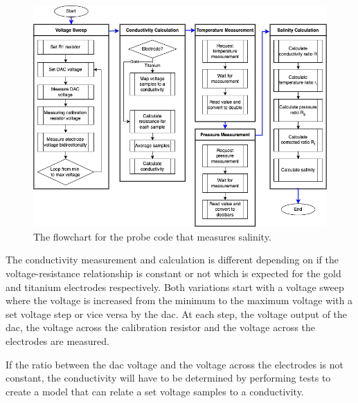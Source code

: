 \begin{figure}[ht]
    \centering
    \includegraphics[width=1\textwidth]{Figures/probe_flowchart}
    \caption{The flowchart for the probe code that measures salinity.}
    \label{fig:probe-code-flowchart} %
\end{figure}

The conductivity measurement and calculation is different depending on if the voltage-resistance relationship is constant or not which is expected for the gold and titanium electrodes respectively.
Both variations start with a voltage sweep where the voltage is increased from the minimum to the maximum voltage with a set voltage step or vice versa by the \gls{dac}.
At each step, the voltage output of the \gls{dac}, the voltage across the calibration resistor and the voltage across the electrodes are measured.

If the ratio between the \gls{dac} voltage and the voltage across the electrodes is not constant, the conductivity will have to be determined by performing tests to create a model that can relate a set voltage samples to a conductivity. 

